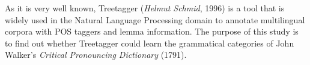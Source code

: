 As it is very well known, Treetagger (\textit{Helmut Schmid}, 1996) is a tool that is widely used in the Natural Language Processing domain to annotate multilingual corpora with POS taggers and lemma information. The purpose of this study is to find out whether Treetagger could learn the grammatical categories of John Walker's \textit{Critical Pronouncing Dictionary }(1791).